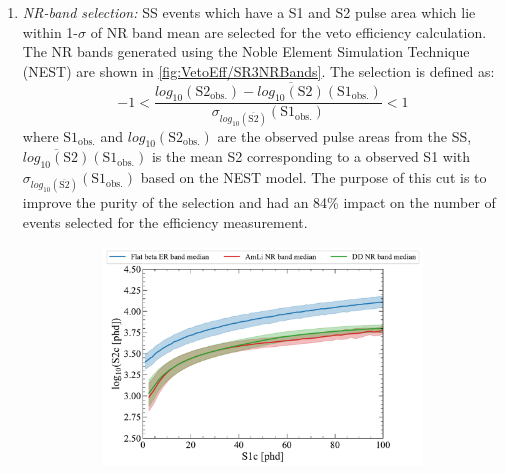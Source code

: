 \begin{enumerate}
	\item \textit{NR-band selection:} SS events which have a S1 and S2 pulse area which lie within 1-$\sigma$ of NR band mean are selected for the veto efficiency calculation.
    The NR bands generated using the Noble Element Simulation Technique (NEST) \cite{NEST2011} are shown in \autoref{fig:VetoEff/SR3NRBands}. 
    The selection is defined as:
    \begin{equation}\label{eqn:VetoEff/NRBandSelection}
        -1<\frac{log_{10}(\text{S2}_\text{obs.})-\overline{log_{10}(\text{S2})}(\text{S1}_\text{obs.})}{\sigma_{log_{10}(\overline{\text{S2}})}(\text{S1}_\text{obs.})}<1
    \end{equation}
    where $\text{S1}_\text{obs.}$ and $log_{10}(\text{S2}_\text{obs.})$ are the observed pulse areas from the SS, $\overline{log_{10}(\text{S2})}(\text{S1}_\text{obs.})$ is the mean S2 corresponding to a observed S1 with $\sigma_{log_{10}(\overline{\text{S2}})}(\text{S1}_\text{obs.})$ based on the NEST model. The purpose of this cut is to improve the purity of the selection and had an 84\% impact on the number of events selected for the efficiency measurement. 
    \begin{figure}[!ht]
    \centering
    \begin{subfigure}[b]{0.49\textwidth}
        \centering
        \includegraphics[width=\textwidth]{figures/VetoEfficiency/NRBands.pdf}
        \caption{}
        \label{fig:VetoEff/SR3NRBands}
    \end{subfigure}
    \hfill
    \begin{subfigure}[b]{0.49\textwidth}
        \centering

\end{subfigure}
\end{figure}
\end{enumerate}

